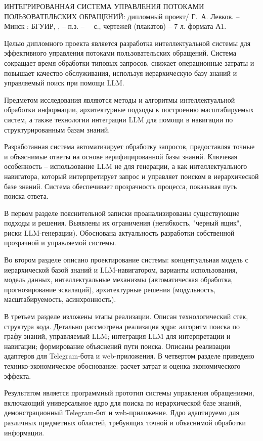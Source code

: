 \thispagestyle{empty}

\MakeUppercase{Интегрированная система управления потоками пользовательских обращений}: дипломный проект/ Г.~А. Левков. -- Минск : БГУИР, \the\year{}, -- п.з. -- ~\pageref*{LastPage}~с., чертежей (плакатов) -- 7 л. формата А1.

\vspace{4\parsep}

Целью дипломного проекта является разработка интеллектуальной системы для эффективного управления потоками пользовательских обращений. Система сокращает время обработки типовых запросов, снижает операционные затраты и повышает качество обслуживания, используя иерархическую базу знаний и управляемый поиск при помощи LLM.

Предметом исследования являются методы и алгоритмы интеллектуальной обработки информации, архитектурные подходы к построению масштабируемых систем, а также технологии интеграции LLM для помощи в навигации по структурированным базам знаний.

Разработанная система автоматизирует обработку запросов, предоставляя точные и объяснимые ответы на основе верифицированной базы знаний. Ключевая особенность – использование LLM не для генерации, а как интеллектуального навигатора, который интерпретирует запрос и управляет поиском в иерархической базе знаний. Система обеспечивает прозрачность процесса, показывая путь поиска ответа.

В первом разделе пояснительной записки проанализированы существующие подходы и решения. Выявлены их ограничения (негибкость, "черный ящик", риски LLM-генерации). Обоснована актуальность разработки собственной прозрачной и управляемой системы.

Во втором разделе описано проектирование системы: концептуальная модель с иерархической базой знаний и LLM-навигатором, варианты использования, модель данных, интеллектуальные механизмы (автоматическая обработка, прогнозирование эскалаций), архитектурные решения (модульность, масштабируемость, асинхронность).

В третьем разделе изложены этапы реализации. Описан технологический стек, структура кода. Детально рассмотрена реализация ядра: алгоритм поиска по графу знаний, управляемый LLM; интеграция LLM для интерпретации и навигации; формирование объяснений пути поиска. Описаны реализации адаптеров для Telegram-бота и web-приложения.
В четвертом разделе приведено технико-экономическое обоснование: расчет затрат и оценка экономического эффекта.

Результатом является программный прототип системы управления обращениями, включающий универсальное ядро для поиска по иерархической базе знаний, демонстрационный Telegram-бот и web-приложение. Ядро адаптируемо для различных предметных областей, требующих точной и объяснимой обработки информации.

\clearpage